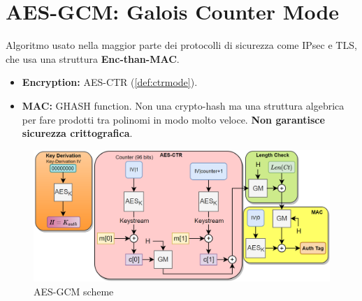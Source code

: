 \section{AES-GCM: Galois Counter Mode}
\vspace{-5mm}
Algoritmo usato nella maggior parte dei protocolli di sicurezza come IPsec e TLS, che usa una struttura \textbf{Enc-than-MAC}. 
\begin{itemize}
    \item \textbf{Encryption:} AES-CTR (\cref{def:ctrmode}).
    \item \textbf{MAC:} GHASH function. Non una crypto-hash ma una struttura algebrica  per fare prodotti tra polinomi in modo molto veloce. \textbf{Non garantisce sicurezza crittografica}.
\end{itemize}\begin{figure}[h]
    \centering
    \includegraphics{image/aesgcm.png}
    \caption{AES-GCM scheme}
    \label{fig:aesgcm}
\end{figure}

